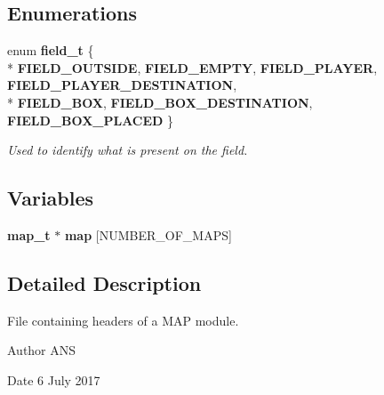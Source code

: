 \subsection*{Enumerations}
\begin{DoxyCompactItemize}
\item 
enum {\bf field\+\_\+t} \{ \\*
{\bfseries F\+I\+E\+L\+D\+\_\+\+O\+U\+T\+S\+I\+DE}, 
{\bfseries F\+I\+E\+L\+D\+\_\+\+E\+M\+P\+TY}, 
{\bfseries F\+I\+E\+L\+D\+\_\+\+P\+L\+A\+Y\+ER}, 
{\bfseries F\+I\+E\+L\+D\+\_\+\+P\+L\+A\+Y\+E\+R\+\_\+\+D\+E\+S\+T\+I\+N\+A\+T\+I\+ON}, 
\\*
{\bfseries F\+I\+E\+L\+D\+\_\+\+B\+OX}, 
{\bfseries F\+I\+E\+L\+D\+\_\+\+B\+O\+X\+\_\+\+D\+E\+S\+T\+I\+N\+A\+T\+I\+ON}, 
{\bfseries F\+I\+E\+L\+D\+\_\+\+B\+O\+X\+\_\+\+P\+L\+A\+C\+ED}
 \}\label{map_8h_a51e8627af914e0f64c0165da729a7977}
\begin{DoxyCompactList}\small\item\em Used to identify what is present on the field. \end{DoxyCompactList}
\end{DoxyCompactItemize}
\subsection*{Variables}
\begin{DoxyCompactItemize}
\item 
{\bf map\+\_\+t} $\ast$ {\bfseries map} [N\+U\+M\+B\+E\+R\+\_\+\+O\+F\+\_\+\+M\+A\+PS]\label{map_8h_a99eb2d81d3fee08aa6c141d540cb589d}

\end{DoxyCompactItemize}


\subsection{Detailed Description}
File containing headers of a M\+AP module. 

\begin{DoxyAuthor}{Author}
A\+NS 
\end{DoxyAuthor}
\begin{DoxyDate}{Date}
6 July 2017 
\end{DoxyDate}
